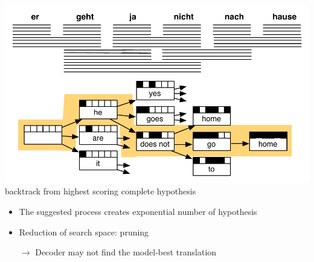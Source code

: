 \documentclass[landscape]{uedslides2C}
\begin{document}
\begin{center}
\includegraphics[scale=1.3]{decoding-step6.pdf}\\[1mm]
backtrack from highest scoring complete hypothesis
\end{center}


\begin{itemize}\vspace{35mm} \itemsep 5mm
\item The suggested process creates exponential number of hypothesis 
\item Reduction of search space: pruning
\item[$\rightarrow$] Decoder may not find the model-best translation
\end{itemize}

\end{document}
